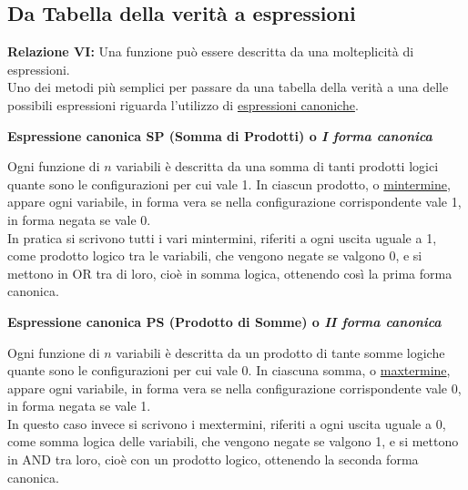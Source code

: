 \documentclass{article}
\begin{document}
\subsection{Da Tabella della verità a espressioni}
\textbf{Relazione VI:} Una funzione può essere descritta da una molteplicità di espressioni.
\vspace{0.2cm}\\
Uno dei metodi più semplici per passare da una tabella della verità a una delle possibili espressioni riguarda l'utilizzo di \underline{espressioni canoniche}.
\begin{center}
    \textbf{Espressione canonica SP (Somma di Prodotti) o \textit{I forma canonica}}
\end{center}
Ogni funzione di $n$ variabili è descritta da una somma di tanti prodotti logici quante sono le configurazioni per cui vale 1. In ciascun prodotto, o \underline{mintermine}, appare ogni variabile, in forma vera se nella configurazione corrispondente vale 1, in forma negata se vale 0.
\vspace{0.1cm}\\
In pratica si scrivono tutti i vari mintermini, riferiti a ogni uscita uguale a 1, come prodotto logico tra le variabili, che vengono negate se valgono 0, e si mettono in OR tra di loro, cioè in somma logica, ottenendo così la prima forma canonica.
\begin{center}
    \textbf{Espressione canonica PS (Prodotto di Somme) o  \textit{II forma canonica}}
\end{center}
Ogni funzione di $n$ variabili è descritta da un prodotto di tante somme logiche quante sono le configurazioni per cui vale 0. In ciascuna somma, o \underline{maxtermine}, appare ogni variabile, in forma vera se nella configurazione corrispondente vale 0, in forma negata se vale 1.
\vspace{0.1cm}\\
In questo caso invece si scrivono i mextermini, riferiti a ogni uscita uguale a 0, come somma logica delle variabili, che vengono negate se valgono 1, e si mettono in AND tra loro, cioè con un prodotto logico, ottenendo la seconda forma canonica.
\end{document}
